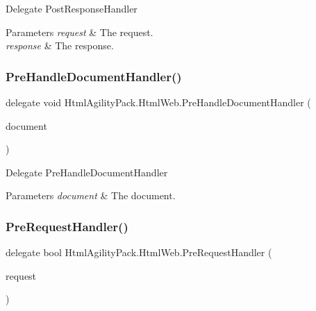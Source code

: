 Delegate Post\+Response\+Handler 


\begin{DoxyParams}{Parameters}
{\em request} & The request.\\
\hline
{\em response} & The response.\\
\hline
\end{DoxyParams}
\mbox{\label{class_html_agility_pack_1_1_html_web_a04fb9c8f6dd4672c86fcb4021008f64e}} 
\subsubsection{\texorpdfstring{Pre\+Handle\+Document\+Handler()}{PreHandleDocumentHandler()}}
{\footnotesize\ttfamily delegate void Html\+Agility\+Pack.\+Html\+Web.\+Pre\+Handle\+Document\+Handler (\begin{DoxyParamCaption}\item[{\hyperlink{class_html_agility_pack_1_1_html_document}{Html\+Document}}]{document }\end{DoxyParamCaption})}



Delegate Pre\+Handle\+Document\+Handler 


\begin{DoxyParams}{Parameters}
{\em document} & The document.\\
\hline
\end{DoxyParams}
\mbox{\label{class_html_agility_pack_1_1_html_web_a114ad10087064af08de4d4293847ef30}} 
\subsubsection{\texorpdfstring{Pre\+Request\+Handler()}{PreRequestHandler()}}
{\footnotesize\ttfamily delegate bool Html\+Agility\+Pack.\+Html\+Web.\+Pre\+Request\+Handler (\begin{DoxyParamCaption}\item[{Http\+Web\+Request}]{request }\end{DoxyParamCaption})}



